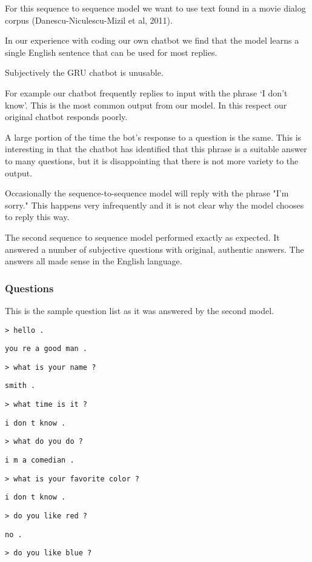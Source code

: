 For this sequence to sequence model we want to use text found in a movie dialog corpus (Danescu-Niculescu-Mizil et al, 2011)\cite{Danescu-Niculescu-Mizil+Lee:11a}. 

In our experience with coding our own chatbot we find that the model learns a single English sentence that can be used for most replies. 

Subjectively the GRU chatbot is unusable.

For example our chatbot frequently replies to input with the phrase `I don't know'. This is the most common output from our model. In this respect our original chatbot responds poorly.

A large portion of the time the bot's response to a question is the same. This is interesting in that the chatbot has identified that this phrase is a suitable answer to many questions, but it is disappointing that there is not more variety to the output.  

Occasionally the sequence-to-sequence model will reply with the phrase "I'm sorry." This happens very infrequently and it is not clear why the model chooses to reply this way. 

The second sequence to sequence model performed exactly as expected. It answered a number of subjective questions with original, authentic answers. The answers all made sense in the English language.

\subsubsection*{Questions}
This is the sample question list as it was answered by the second model.

\texttt{> hello .} 

\texttt{you re a good man .}

\texttt{> what is your name ?} 

\texttt{smith .}

\texttt{> what time is it ?} 

\texttt{i don t know .}

\texttt{> what do you do ?} 

\texttt{i m a comedian .}

\texttt{> what is your favorite color ?} 

\texttt{i don t know .}

\texttt{> do you like red ?} 

\texttt{no .}

\texttt{> do you like blue ?} 

